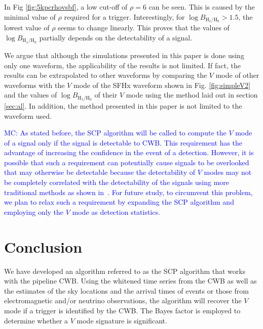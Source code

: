 \documentclass[aps,twocolumn,showpacs,groupedaddress, nofootinbib]{revtex4}  %
\newcommand{\MC}[1]{\textcolor{blue}{MC: #1}}
\begin{document}
In Fig \ref{fig:5kpcrhovsbf}, a low cut-off of $\rho = 6$ can be seen. 
This is caused by the minimal value of $\rho$ required for a trigger.  
Interestingly, for $\log B_{\text{H}_1 / \text{H}_0} > 1.5$, the lowest value of $\rho$ seems to change linearly. 
This proves that the values of $\log B_{\text{H}_1 / \text{H}_0}$ partially depends on the detectability of a signal.

We argue that although the simulations presented in this paper is done using only one waveform, the applicability of the results is not limited. 
If fact, the results can be extrapolated to other waveforms by comparing the $V$ mode of other waveforms with the $V$ mode of the SFHx waveform shown in Fig. \ref{fig:simpleV2}
and the values of $\log B_{\text{H}_1 / \text{H}_0}$ of their $V$ mode using the method laid out in section \ref{sec:al}.
In addition, the method presented in this paper is not limited to the waveform used.

\MC{As stated before, the \ac{SCP} algorithm will be called to compute the $V$ mode of a signal 
only if the signal is detectable to \ac{CWB}. 
This requirement has the advantage of increasing the confidence in the event of a detection.
However, it is possible that such a requirement can potentially cause signals to be overlooked that may otherwise be detectable because
the detectability of $V$ modes may not be completely correlated with the detectability of the signals using more traditional methods as shown in~\cite{hayama2018circular}.
For future study, to circumvent this problem, 
we plan to relax such a requirement by expanding the \ac{SCP} algorithm and employing only the $V$ mode as detection statistics.} 


\section{Conclusion}\label{sec:conclusion}
We have developed an algorithm referred to as the \ac{SCP} algorithm that works with the pipeline \ac{CWB}.
Using the whitened time series from the \ac{CWB} as well as the 
estimates of the sky locations and the arrival times of events or those from electromagnetic and/or neutrino observations,
the algorithm will recover the $V$ mode if a trigger is identified by the \ac{CWB}. 
The Bayes factor is employed to determine whether a $V$ mode signature is significant. 
\end{document}
